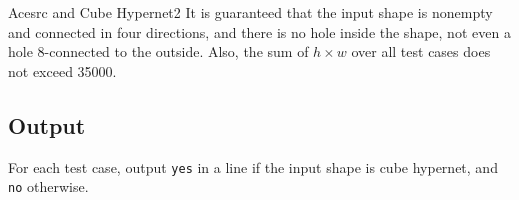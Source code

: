\begin{Problem}{Acesrc and Cube Hypernet}{2}
It is guaranteed that the input shape is nonempty and connected in four directions, and there is no hole inside the shape, not even a hole 8-connected to the outside. Also, the sum of $h \times w$ over all test cases does not exceed 35000.

\subsection*{Output}

For each test case, output \texttt{yes} in a line if the input shape is cube hypernet, and \texttt{no} otherwise.


\end{Problem}
